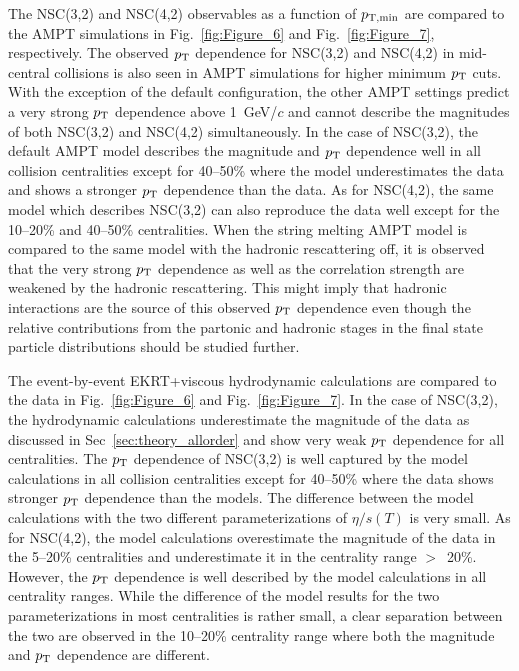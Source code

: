 The NSC(3,2) and NSC(4,2) observables as a function of $p_{\rm T, min}$ are compared to the {AMPT} simulations in Fig.~\ref{fig:Figure_6} and Fig.~\ref{fig:Figure_7}, respectively.
The observed $p_{\rm T}$ dependence for NSC(3,2) and NSC(4,2) in mid-central collisions is also seen in AMPT simulations for higher minimum $p_{\rm T}$ cuts.
With the exception of the default configuration, the other AMPT settings predict a very strong $p_{\rm T}$ dependence above 1~GeV/$c$ and cannot describe the magnitudes of both NSC(3,2) and NSC(4,2) simultaneously.
In the case of NSC(3,2), the default AMPT model describes the magnitude and $p_{\rm T}$ dependence well in all collision centralities except for 40--50\% where the model underestimates the data and shows a stronger $p_{\rm T}$ dependence than the data.
As for  NSC(4,2), the same model which describes NSC(3,2) can also reproduce the data well except for the 10--20\% and 40--50\% centralities.
When the string melting AMPT model is compared to the same model with the hadronic rescattering off, it is observed that the very strong $p_{\rm T}$ dependence as well as the correlation strength are weakened by the hadronic rescattering.
This might imply that hadronic interactions are the source of this observed $p_{\rm T}$ dependence even though the relative contributions from the partonic and hadronic stages in the final state particle distributions should be studied further.

The event-by-event EKRT+viscous hydrodynamic calculations are compared to the data in Fig.~\ref{fig:Figure_6} and Fig.~\ref{fig:Figure_7}.
In the case of NSC(3,2), the hydrodynamic calculations underestimate the magnitude of the data as discussed in Sec~\ref{sec:theory_allorder} and show very weak $p_{\rm T}$ dependence for all centralities.
The $p_{\rm T}$ dependence of NSC(3,2) is well captured by the model calculations in all collision centralities except for 40--50\% where the data shows stronger $p_{\rm T}$ dependence than the models. The difference between the model calculations with the two different parameterizations of $\eta/s(T)$ is very small. 
As for NSC(4,2), the model calculations overestimate the magnitude of the data in the 5--20\% centralities and underestimate it in the centrality range $>$~20\%. However, the $p_{\rm T}$ dependence is well described by the model calculations in all centrality ranges. 
While the difference of the model results for the two parameterizations in most centralities is rather small, a clear separation between the two are observed in the 10--20\% centrality range where both the magnitude and $p_{\rm T}$ dependence are different.

